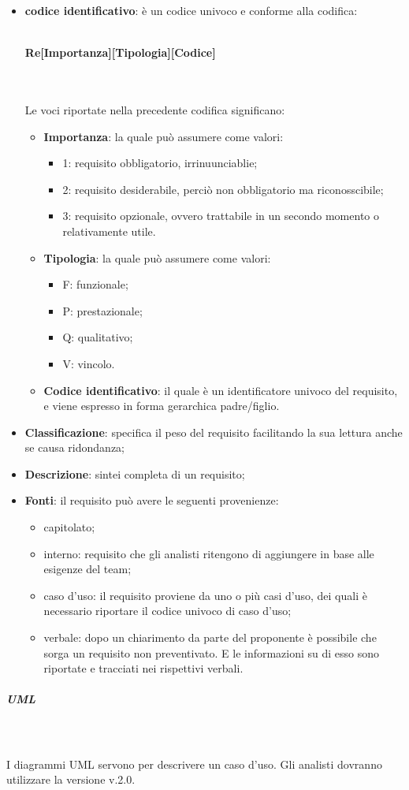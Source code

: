 				\begin{itemize}
					\item \textbf{codice identificativo}: è un codice univoco e conforme alla codifica: \\ \\
					\centerline{\textbf{Re[Importanza][Tipologia][Codice]}} \\ \\
					Le voci riportate nella precedente codifica significano: 
					\begin{itemize}
						\item \textbf{Importanza}: la quale può assumere come valori:
						\begin{itemize}
							\item 1: requisito obbligatorio, irrinuunciablie;
							\item 2: requisito desiderabile, perciò non obbligatorio ma riconosscibile;
							\item 3: requisito opzionale, ovvero trattabile in un secondo momento o relativamente utile.
						\end{itemize}
						\item \textbf{Tipologia}: la quale può assumere come valori:
						\begin{itemize}
							\item F: funzionale;
							\item P: prestazionale;
							\item Q: qualitativo;
							\item V: vincolo.
						\end{itemize}
						\item \textbf{Codice identificativo}: il quale è un identificatore univoco del requisito, e viene espresso in forma gerarchica padre/figlio.
					\end{itemize}
					\item \textbf{Classificazione}: specifica il peso del requisito facilitando la sua lettura anche se causa ridondanza;
					\item \textbf{Descrizione}: sintei completa di un requisito;
					\item \textbf{Fonti}: il requisito può avere le seguenti provenienze:
					\begin{itemize}
						\item capitolato;
						\item interno: requisito che gli analisti ritengono di aggiungere in base alle esigenze del team;
						\item caso d'uso: il requisito proviene da uno o più casi d'uso, dei quali è necessario riportare il codice univoco di caso d'uso;
						\item verbale: dopo un chiarimento da parte del proponente è possibile che sorga un requisito non preventivato. E le informazioni su di esso sono riportate e tracciati nei rispettivi verbali.
					\end{itemize}
				\end{itemize} 
				\subparagraph*{UML} \mbox{} \\ \mbox{} \\
				I diagrammi UML servono per descrivere un caso d'uso. Gli analisti dovranno utilizzare la versione v.2.0.
